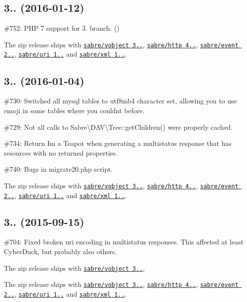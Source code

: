 \subsection*{3.. (2016-\/01-\/12) }


\begin{DoxyItemize}
\item \#752\+: P\+HP 7 support for 3. branch. ()
\item The zip release ships with \href{http://sabre.io/vobject/}{\tt sabre/vobject 3..}, \href{http://sabre.io/http/}{\tt sabre/http 4..}, \href{http://sabre.io/event/}{\tt sabre/event 2..}, \href{http://sabre.io/uri/}{\tt sabre/uri 1..} and \href{http://sabre.io/xml/}{\tt sabre/xml 1..}.
\end{DoxyItemize}

\subsection*{3.. (2016-\/01-\/04) }


\begin{DoxyItemize}
\item \#730\+: Switched all mysql tables to {\ttfamily utf8mb4} character set, allowing you to use emoji in some tables where you couldn\textquotesingle{}t before.
\item \#729\+: Not all calls to {\ttfamily Sabre\textbackslash{}D\+AV\textbackslash{}Tree\+::get\+Children()} were properly cached.
\item \#734\+: Return { I\textquotesingle{}m a Teapot} when generating a multistatus response that has resources with no returned properties.
\item \#740\+: Bugs in {\ttfamily migrate20.\+php} script.
\item The zip release ships with \href{http://sabre.io/vobject/}{\tt sabre/vobject 3..}, \href{http://sabre.io/http/}{\tt sabre/http 4..}, \href{http://sabre.io/event/}{\tt sabre/event 2..}, \href{http://sabre.io/uri/}{\tt sabre/uri 1..} and \href{http://sabre.io/xml/}{\tt sabre/xml 1..}.
\end{DoxyItemize}

\subsection*{3.. (2015-\/09-\/15) }


\begin{DoxyItemize}
\item \#704\+: Fixed broken uri encoding in multistatus responses. This affected at least Cyber\+Duck, but probably also others.
\item The zip release ships with \href{http://sabre.io/vobject/}{\tt sabre/vobject 3..},
\item The zip release ships with \href{http://sabre.io/vobject/}{\tt sabre/vobject 3..}, \href{http://sabre.io/http/}{\tt sabre/http 4..}, \href{http://sabre.io/event/}{\tt sabre/event 2..}, \href{http://sabre.io/uri/}{\tt sabre/uri 1..} and \href{http://sabre.io/xml/}{\tt sabre/xml 1..}.
\end{DoxyItemize}

